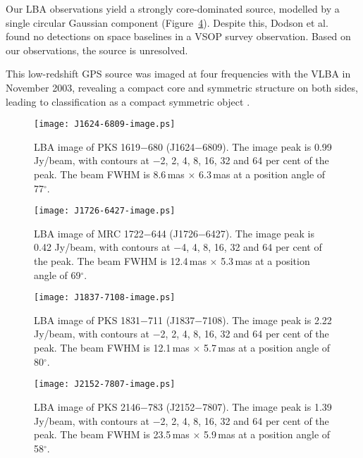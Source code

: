 \documentclass{pasa}%
\begin{document}
Our LBA observations yield a strongly core-dominated source, modelled
by a single circular Gaussian component (Figure~\ref{Fig5}).  Despite
this, Dodson et al.\  found no detections on space
baselines in a VSOP survey observation.  Based on our observations,
the source is unresolved. 

This low-redshift GPS source was imaged at four frequencies with the
VLBA in November 2003, revealing a compact core and symmetric
structure on both sides, leading to classification as a compact
symmetric object \cite{tied15}.


\begin{figure}
\begin{center}
\texttt{[image: J1624-6809-image.ps]}
\caption{LBA image of PKS 1619$-$680 (J1624$-$6809).
The image peak is 0.99 Jy/beam, with contours at
$-$2, 2, 4, 8, 16, 32 and 64 per cent of the peak.
The beam FWHM is 8.6\,mas $\times$ 6.3\,mas at a position angle of 77$^\circ$.}\label{Fig2}
\end{center}
\end{figure}



\begin{figure}
\begin{center}
\texttt{[image: J1726-6427-image.ps]}
\caption{LBA image of MRC 1722$-$644 (J1726$-$6427). 
The image peak is 0.42 Jy/beam, with contours at
$-$4, 4, 8, 16, 32 and 64 per cent of the peak.
The beam FWHM is 12.4\,mas $\times$ 5.3\,mas at a position angle of 69$^\circ$.}\label{Fig3}
\end{center}
\end{figure}

\begin{figure}
\begin{center}
\texttt{[image: J1837-7108-image.ps]}
\caption{LBA image of PKS 1831$-$711 (J1837$-$7108).
The image peak is 2.22 Jy/beam, with contours at
$-$2, 2, 4, 8, 16, 32 and 64 per cent of the peak.
The beam FWHM is 12.1\,mas $\times$ 5.7\,mas at a position angle of 80$^\circ$.}\label{Fig4}
\end{center}
\end{figure}


\begin{figure}
\begin{center}
\texttt{[image: J2152-7807-image.ps]}
\caption{LBA image of PKS 2146$-$783 (J2152$-$7807). 
The image peak is 1.39 Jy/beam, with contours at
$-$2, 2, 4, 8, 16, 32 and 64 per cent of the peak.
The beam FWHM is 23.5\,mas $\times$ 5.9\,mas at a position angle of 58$^\circ$.}\label{Fig5}
\end{center}
\end{figure}
\end{document}
